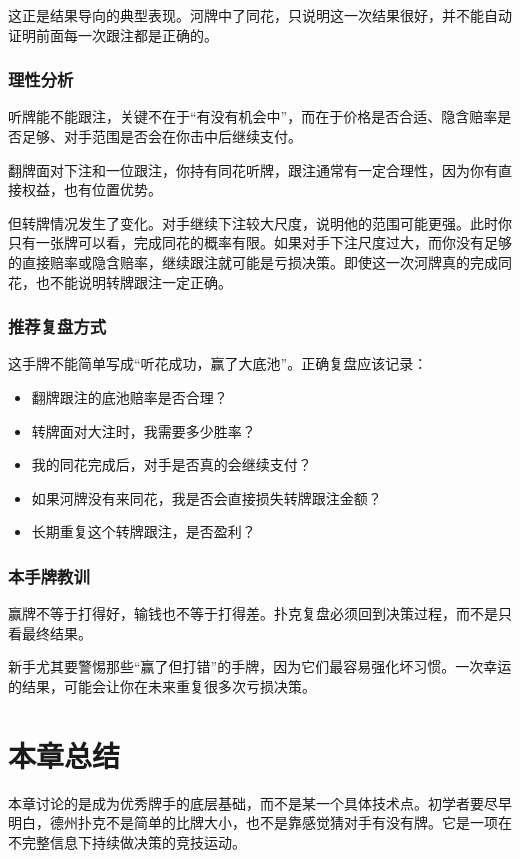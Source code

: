 这正是结果导向的典型表现。河牌中了同花，只说明这一次结果很好，并不能自动证明前面每一次跟注都是正确的。

\subsubsection*{理性分析}

听牌能不能跟注，关键不在于“有没有机会中”，而在于价格是否合适、隐含赔率是否足够、对手范围是否会在你击中后继续支付。

翻牌面对下注和一位跟注，你持有同花听牌，跟注通常有一定合理性，因为你有直接权益，也有位置优势。

但转牌情况发生了变化。对手继续下注较大尺度，说明他的范围可能更强。此时你只有一张牌可以看，完成同花的概率有限。如果对手下注尺度过大，而你没有足够的直接赔率或隐含赔率，继续跟注就可能是亏损决策。即使这一次河牌真的完成同花，也不能说明转牌跟注一定正确。

\subsubsection*{推荐复盘方式}

这手牌不能简单写成“听花成功，赢了大底池”。正确复盘应该记录：

\begin{itemize}
\item 翻牌跟注的底池赔率是否合理？
\item 转牌面对大注时，我需要多少胜率？
\item 我的同花完成后，对手是否真的会继续支付？
\item 如果河牌没有来同花，我是否会直接损失转牌跟注金额？
\item 长期重复这个转牌跟注，是否盈利？
\end{itemize}

\subsubsection*{本手牌教训}

赢牌不等于打得好，输钱也不等于打得差。扑克复盘必须回到决策过程，而不是只看最终结果。

新手尤其要警惕那些“赢了但打错”的手牌，因为它们最容易强化坏习惯。一次幸运的结果，可能会让你在未来重复很多次亏损决策。

\section{本章总结}

本章讨论的是成为优秀牌手的底层基础，而不是某一个具体技术点。初学者要尽早明白，德州扑克不是简单的比牌大小，也不是靠感觉猜对手有没有牌。它是一项在不完整信息下持续做决策的竞技运动。


